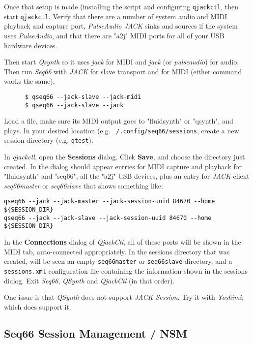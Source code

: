    Once that setup is made (installing the script and configuring
   \texttt{qjackctl}, then start \texttt{qjackctl}.
   Verify that there are a number of system audio and MIDI playback and capture
   port, \textsl{PulseAudio JACK} sinks and sources if the system uses
   \textsl{PulseAudio}, and that there are "a2j" MIDI ports for all of your USB
   hardware devices.

   Then start \textsl{Qsynth} so it uses \textsl{jack} for MIDI and
   \textsl{jack} (or \textsl{pulseaudio}) for audio.
   Then run \textsl{Seq66} with \textsl{JACK} for slave transport and for MIDI
   (either command works the same):

   \begin{verbatim}
      $ qseq66 --jack-slave --jack-midi
      $ qseq66 --jack-slave --jack
   \end{verbatim}

   Load a file, make sure its MIDI output goes to "fluidsynth" or "qsynth", and
   plays.
   In your desired location (e.g. \texttt{~/.config/seq66/sessions},
   create a new session directory (e.g. \texttt{qtest}).

   In \textsl{qjackctl}, open the \textbf{Sessions} dialog.
   Click \textbf{Save}, and choose the directory just created.
   In the dialog should appear entries for MIDI capture and playback for
   "fluidsynth" and "seq66", all the "a2j" USB devices,
   plus an entry for \textsl{JACK} client
   \textsl{seq66master} or \textsl{seq66slave} that shows
   something like:

   \begin{verbatim}
qseq66 --jack --jack-master --jack-session-uuid 84670 --home ${SESSION_DIR}
qseq66 --jack --jack-slave --jack-session-uuid 84670 --home ${SESSION_DIR}
   \end{verbatim}

   In the \textbf{Connections} dialog of \textsl{QjackCtl}, all of these ports
   will be shown in the MIDI tab, auto-connected appropriately.
   In the sessions directory that was created, will be seen an
   empty \texttt{seq66master}
   or \texttt{seq66slave} directory, and a
   \texttt{sessions.xml} configuration file containing the information shown in
   the sessions dialog.
   Exit \textsl{Seq66}, \textsl{QSynth} and \textsl{QjackCtl}
   (in that order).

   One issue is that \textsl{QSynth}
   does not support \textsl{JACK Session}.
   Try it with \textsl{Yoshimi}, which does support it.

\subsection{Seq66 Session Management / NSM}
\label{subsec:sessions_nsm}

